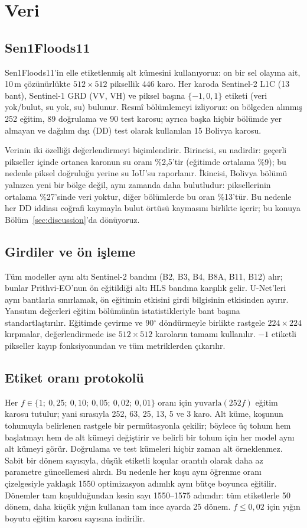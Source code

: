 \documentclass[conference]{IEEEtran}
\begin{document}
\section{Veri}
\subsection{Sen1Floods11}
Sen1Floods11'in elle etiketlenmiş alt kümesini kullanıyoruz: on bir sel olayına ait, 10\,m çözünürlükte $512\times512$ piksellik 446 karo. Her karoda Sentinel-2 L1C (13 bant), Sentinel-1 GRD (VV, VH) ve piksel başına $\{-1, 0, 1\}$ etiketi (veri yok/bulut, su yok, su) bulunur. Resmî bölümlemeyi izliyoruz: on bölgeden alınmış 252 eğitim, 89 doğrulama ve 90 test karosu; ayrıca başka hiçbir bölümde yer almayan ve dağılım dışı (DD) test olarak kullanılan 15 Bolivya karosu.

Verinin iki özelliği değerlendirmeyi biçimlendirir. Birincisi, su nadirdir: geçerli pikseller içinde ortanca karonun su oranı \%2,5'tir (eğitimde ortalama \%9); bu nedenle piksel doğruluğu yerine su IoU'su raporlanır. İkincisi, Bolivya bölümü yalnızca yeni bir bölge değil, aynı zamanda daha bulutludur: piksellerinin ortalama \%27'sinde veri yoktur, diğer bölümlerde bu oran \%13'tür. Bu nedenle her DD iddiası coğrafi kaymayla bulut örtüsü kaymasını birlikte içerir; bu konuya Bölüm~\ref{sec:discussion}'da dönüyoruz.

\subsection{Girdiler ve ön işleme}
Tüm modeller aynı altı Sentinel-2 bandını (B2, B3, B4, B8A, B11, B12) alır; bunlar Prithvi-EO'nun ön eğitildiği altı HLS bandına karşılık gelir. U-Net'leri aynı bantlarla sınırlamak, ön eğitimin etkisini girdi bilgisinin etkisinden ayırır. Yansıtım değerleri eğitim bölümünün istatistikleriyle bant başına standartlaştırılır. Eğitimde çevirme ve 90$^\circ$ döndürmeyle birlikte rastgele $224\times224$ kırpmalar, değerlendirmede ise $512\times512$ karoların tamamı kullanılır. $-1$ etiketli pikseller kayıp fonksiyonundan ve tüm metriklerden çıkarılır.

\subsection{Etiket oranı protokolü}
Her $f\in\{1;\ 0{,}25;\ 0{,}10;\ 0{,}05;\ 0{,}02;\ 0{,}01\}$ oranı için $\mathrm{yuvarla}(252 f)$ eğitim karosu tutulur; yani sırasıyla 252, 63, 25, 13, 5 ve 3 karo. Alt küme, koşunun tohumuyla belirlenen rastgele bir permütasyonla çekilir; böylece üç tohum hem başlatmayı hem de alt kümeyi değiştirir ve belirli bir tohum için her model aynı alt kümeyi görür. Doğrulama ve test kümeleri hiçbir zaman alt örneklenmez. Sabit bir dönem sayısıyla, düşük etiketli koşular orantılı olarak daha az parametre güncellemesi alırdı. Bu nedenle her koşu aynı öğrenme oranı çizelgesiyle yaklaşık 1550 optimizasyon adımlık aynı bütçe boyunca eğitilir. Dönemler tam koşulduğundan kesin sayı 1550--1575 adımdır: tüm etiketlerle 50 dönem, daha küçük yığın kullanan tam ince ayarda 25 dönem. $f\le0{,}02$ için yığın boyutu eğitim karosu sayısına indirilir.
\end{document}
